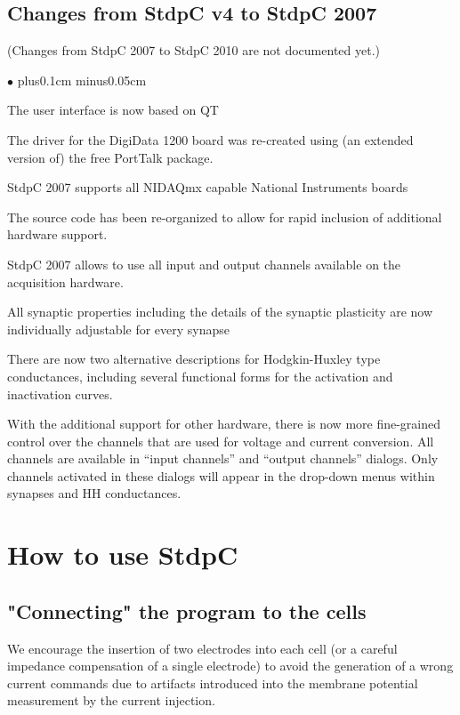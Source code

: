 \documentclass{article}
\newenvironment{myitem}{\begin{list}{$\bullet$}{\setlength{\leftmargin}{1.1em}
\itemsep0.1cm plus0.1cm minus0.05cm
\listparindent0cm
\addtolength{\labelsep}{0.5\labelsep}
\setlength{\labelwidth}{0.8em}
\setlength{\leftmargin}{\labelwidth}
\addtolength{\leftmargin}{\labelsep}
}}{\end{list}}
\begin{document}
\subsection{Changes from StdpC v4 to StdpC 2007}
(Changes from StdpC 2007 to StdpC 2010 are not documented yet.)
\begin{myitem}
\item The user interface is now based on QT
\item The driver for the DigiData 1200 board was re-created using (an
  extended version of) the free PortTalk package.
\item StdpC 2007 supports all NIDAQmx capable National Instruments boards
\item The source code has been re-organized to allow for rapid
  inclusion of additional hardware support.
\item StdpC 2007 allows to use all input and output channels available
  on the acquisition hardware.
\item All synaptic properties including the details of the synaptic
  plasticity are now individually adjustable for every synapse
\item There are now two alternative descriptions for Hodgkin-Huxley
  type conductances, including several functional forms for the
  activation and inactivation curves.
\item With the additional support for other hardware, there is now
  more fine-grained control over the channels that are used for
  voltage and current conversion. All channels are available in
  ``input channels'' and ``output channels'' dialogs. Only channels
  activated in these dialogs will appear in the drop-down menus within
  synapses and HH conductances.
\end{myitem}

\section{How to use StdpC}

\subsection{"Connecting" the program to the cells}
 
We encourage the insertion of two electrodes into each cell (or a
careful impedance compensation of a single electrode) to avoid the
generation of a wrong current commands due to artifacts introduced
into the membrane potential measurement by the current injection.
\end{document}
